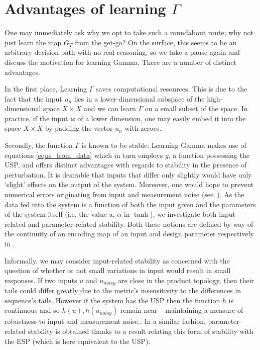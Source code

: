 \documentclass[a4paper,12pt,twoside]{report}
\begin{document}
\section{Advantages of learning $\Gamma$} \label{subs_LearnGamma}

One may immediately ask why we opt to take such a roundabout route; why not just learn the map $G_T$ from the get-go? On the surface, this seems to be an arbitrary decision path with no real reasoning, so we take a pause again and discuss the motivation for learning Gamma.
There are a number of distinct advantages. 

In the first place, Learning $\Gamma$ saves computational resources. This is due to the fact that the input $u_n$ lies in a lower-dimensional subspace of the high-dimensional space $X\times{X}$ and we can learn $\Gamma$ on a small subset of the space. In practice, if the input is of a  lower dimension, one may easily embed it into the space $X\times{X}$ by padding the vector $u_n$ with zeroes.

Secondly, the function $\Gamma$ is known to be stable. Learning Gamma makes use of equations \ref{eqns_from_data} which in turn employs $g$, a function possessing the USP, and offers distinct advantages with regards to stability in the presence of perturbation. It is desirable that inputs that differ only slightly would have only ‘slight’ effects on the output of the system. Moreover, one would hope to prevent numerical errors originating from input and measurement noise (see~\cite[Th. 5]{manjunath2021universal}). 
As the data fed into the system is a function of both the input given and the parameters of the system itself (i.e. the value a, $\alpha$ in $\tanh$), we investigate both input-related and parameter-related stability. Both these notions are defined by way of the continuity of an encoding map of an input and design parameter respectively in \cite{manjunath2020stability}.\

Informally, we may consider input-related stability as concerned with the question of whether or not small variations in input would result in small responses.   
If two inputs $u$ and $u_{noisy}$ are close in the product topology, then their tails could differ greatly due to the metric's insensitivity to the differences in sequence's tails.
 However if the system has the USP then the function $h$ is continuous and so $h(u), h(u_{noisy})$ remain near – maintaining a measure of robustness to input and measurement noise.\cite{manjunath2021universal}.
In a similar fashion, parameter-related stability is obtained thanks to a result \cite[Lemma 3.2]{manjunath2020stability} relating this form of stability with the ESP (which is here equivalent to the USP).
\end{document}

